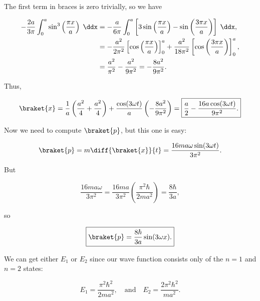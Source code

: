 \begin{parts}
The first term in braces is zero trivially, so we have

\begin{align*}
    -\frac{2a}{3\pi} \int_0^a \sin^3\left( \frac{\pi x}{a} \right)\;\ddx &= -\frac{a}{6\pi} \int_0^a \left[ 3\sin\left( \frac{\pi x}{a} \right) - \sin\left( \frac{3\pi x}{a} \right) \right]\;\ddx, \\
    &= -\frac{a^2}{2\pi^2} \left[ \cos\left( \frac{\pi x}{a} \right) \right]_0^a + \frac{a^2}{18\pi^2}\left[ \cos\left( \frac{3\pi x}{a} \right) \right]_0^a, \\
    &= \frac{a^2}{\pi^2} - \frac{a^2}{9\pi^2} = -\frac{8a^2}{9\pi^2}.
\end{align*}

Thus,

\begin{equation*}
    \braket{x} = \frac{1}{a}\left( \frac{a^2}{4} + \frac{a^2}{4} \right) + \frac{\cos(3\omega t)}{a} \left( -\frac{8a^2}{9\pi^2} \right) = \boxed{\frac{a}{2} - \frac{16a\cos(3\omega t)}{9\pi^2}.}
\end{equation*}




\item Now we need to compute $\braket{p}$, but this one is easy:

\begin{equation*}
    \braket{p} = m\diff{\braket{x}}{t} = \frac{16ma\omega\sin(3\omega t)}{3\pi^2}.
\end{equation*}

But

\begin{equation*}
    \frac{16ma\omega}{3\pi^2} = \frac{16ma}{3\pi^2}\left( \frac{\pi^2\hbar}{2ma^2} \right) = \frac{8\hbar}{3a},
\end{equation*}

so

\begin{equation*}
    \boxed{\braket{p} = \frac{8\hbar}{3a}\sin(3\omega x).}
\end{equation*}




\item We can get either $E_1$ or $E_2$ since our wave function consists only of the $n=1$ and $n=2$ states:

\begin{equation*}
    E_1 = \frac{\pi^2\hbar^2}{2ma^2}, \quad \mathrm{and} \quad E_2 = \frac{2\pi^2\hbar^2}{ma^2}.
\end{equation*}


\end{parts}
